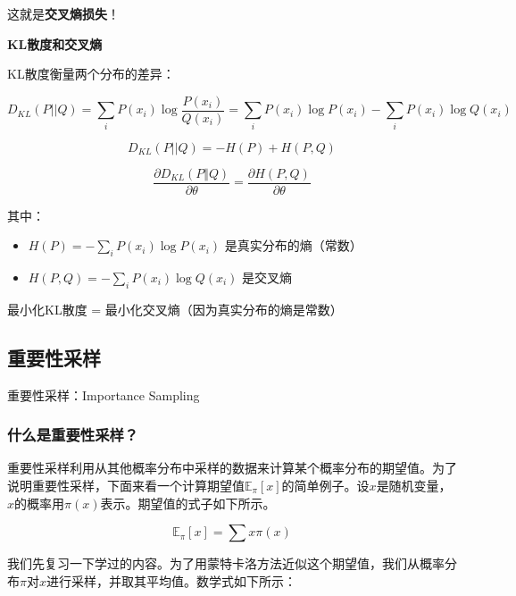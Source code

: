 \documentclass[lang=cn,newtx,10pt,scheme=chinese]{elegantbook}
\begin{document}
这就是\textbf{交叉熵损失}！

\textbf{KL散度和交叉熵}

KL散度衡量两个分布的差异：

\begin{equation}
D_{KL}(P||Q) = \sum_{i} P(x_i) \log \frac{P(x_i)}{Q(x_i)} = \sum_{i} P(x_i) \log P(x_i) - \sum_{i} P(x_i) \log Q(x_i)
\end{equation}

\begin{equation}
D_{KL}(P||Q) = -H(P) + H(P,Q)
\end{equation}

\begin{equation}
\frac{\partial D_{KL}(P\Vert Q)}{\partial\theta} = \frac{\partial H(P, Q)}{\partial \theta}
\end{equation}

其中：

\begin{itemize}
\item $H(P) = -\sum_{i} P(x_i) \log P(x_i)$ 是真实分布的熵（常数）
\item $H(P,Q) = -\sum_{i} P(x_i) \log Q(x_i)$ 是交叉熵
\end{itemize}

最小化KL散度 = 最小化交叉熵（因为真实分布的熵是常数）

\subsection{重要性采样}

\begin{marker}
重要性采样：Importance Sampling
\end{marker}

\subsubsection{什么是重要性采样？}

重要性采样利用从其他概率分布中采样的数据来计算某个概率分布的期望值。为了说明重要性采样，下面来看一个计算期望值$\mathbb{E}_\pi[x]$的简单例子。设$x$是随机变量，$x$的概率用$\pi(x)$表示。期望值的式子如下所示。

\begin{equation}
\mathbb{E}_\pi[x] = \sum x \pi(x)
\end{equation}

我们先复习一下学过的内容。为了用蒙特卡洛方法近似这个期望值，我们从概率分布$\pi$对$x$进行采样，并取其平均值。数学式如下所示：
\end{document}
